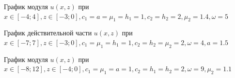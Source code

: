 \documentclass[a4paper, 12pt]{article}
\begin{document}
            \begin{figure}[h!]
                \noindent{}
                \caption{График модуля $u(x,z)$ при $x \in [-4;4], z \in [-3;0], c_1=a=\mu_1=h_1=1, c_2=h_2=2, \mu_2=1.4, \omega =5$}
                \label{figCurves}
                \end{figure}

    \begin{figure}[h!]
    \noindent{}
    \caption{График действительной части $u(x,z)$ при $x \in [-7;7], z \in [-3;0], c_1=\mu_1=h_1=1, c_2=h_2=\mu_2=2, \omega =4, a=1.5$}
    \label{figCurves}
    \end{figure}  

    \begin{figure}[h!]
        \noindent{}
        \caption{График модуля $u(x,z)$ при $x \in [-8;12], z \in [-4;0], c_1=\mu_1=a=1, c_2=h_1=h_2=2, \omega =9, \mu_2=1.1$}
        \label{figCurves}
        \end{figure} 
\end{document}
